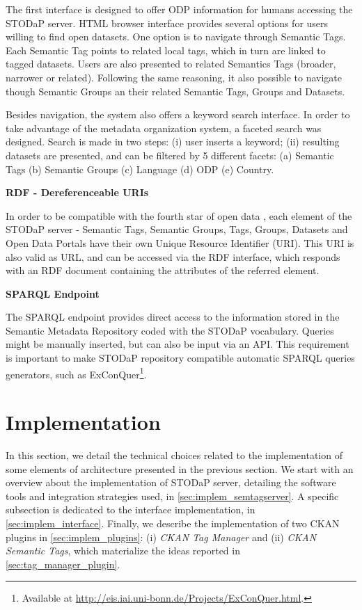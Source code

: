 The first interface is designed to offer ODP information for humans accessing the STODaP server.
HTML browser interface provides several options for users willing to find open datasets.
One option is to navigate through Semantic Tags.
Each Semantic Tag points to related local tags, which in turn are linked to tagged datasets.
Users are also presented to related Semantics Tags (broader, narrower or related).
Following the same reasoning, it also possible to navigate though Semantic Groups an their related Semantic Tags, Groups and Datasets.

Besides navigation, the system also offers a keyword search interface.
In order to take advantage of the metadata organization system, a faceted search was designed.
Search is made in two steps: (i) user inserts a keyword; (ii) resulting datasets are presented, and can be filtered by 5 different facets: (a) Semantic Tags (b) Semantic Groups (c) Language (d) ODP (e) Country. 

\noindent\textbf{RDF - Dereferenceable URIs}

In order to be compatible with the fourth star of open data \cite{Berners-Lee2010}, each element of the STODaP server - Semantic Tags, Semantic Groups, Tags, Groups, Datasets and Open Data Portals have their own Unique Resource Identifier (URI).
This URI is also valid as URL, and can be accessed via the RDF interface, which responds with an RDF document containing the attributes of the referred element.

\noindent\textbf{SPARQL Endpoint}

The SPARQL endpoint provides direct access to the information stored in the Semantic Metadata Repository coded with the STODaP vocabulary.
Queries might be manually inserted, but can also be input via an API.
This requirement is important to make STODaP repository compatible automatic SPARQL queries generators, such as ExConQuer\footnote{Available at \url{http://eis.iai.uni-bonn.de/Projects/ExConQuer.html}.}.

\section{Implementation}
\label{sec:implementation}

In this section, we detail the technical choices related to the implementation of some elements of architecture presented in the previous section.
We start with an overview about the implementation of STODaP server, detailing the software tools and integration strategies used, in \autoref{sec:implem_semtagserver}.
A specific subsection is dedicated to the interface implementation, in \autoref{sec:implem_interface}.
Finally, we describe the implementation of two CKAN plugins in \autoref{sec:implem_plugins}:
(i) \emph{CKAN Tag Manager} and 
(ii) \emph{CKAN Semantic Tags}, which materialize the ideas reported in \autoref{sec:tag_manager_plugin}.

